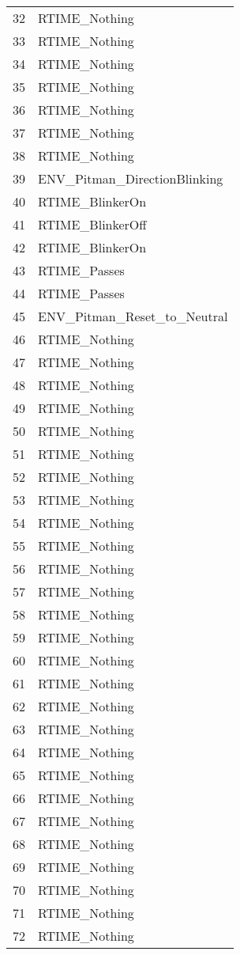 \documentclass[11pt]{article}
\begin{document}
\begin{longtable}{ll}
32 & RTIME\_Nothing \\
33 & RTIME\_Nothing \\
34 & RTIME\_Nothing \\
35 & RTIME\_Nothing \\
36 & RTIME\_Nothing \\
37 & RTIME\_Nothing \\
38 & RTIME\_Nothing \\
39 & ENV\_Pitman\_DirectionBlinking \\
40 & RTIME\_BlinkerOn \\
41 & RTIME\_BlinkerOff \\
42 & RTIME\_BlinkerOn \\
43 & RTIME\_Passes \\
44 & RTIME\_Passes \\
45 & ENV\_Pitman\_Reset\_to\_Neutral \\
46 & RTIME\_Nothing \\
47 & RTIME\_Nothing \\
48 & RTIME\_Nothing \\
49 & RTIME\_Nothing \\
50 & RTIME\_Nothing \\
51 & RTIME\_Nothing \\
52 & RTIME\_Nothing \\
53 & RTIME\_Nothing \\
54 & RTIME\_Nothing \\
55 & RTIME\_Nothing \\
56 & RTIME\_Nothing \\
57 & RTIME\_Nothing \\
58 & RTIME\_Nothing \\
59 & RTIME\_Nothing \\
60 & RTIME\_Nothing \\
61 & RTIME\_Nothing \\
62 & RTIME\_Nothing \\
63 & RTIME\_Nothing \\
64 & RTIME\_Nothing \\
65 & RTIME\_Nothing \\
66 & RTIME\_Nothing \\
67 & RTIME\_Nothing \\
68 & RTIME\_Nothing \\
69 & RTIME\_Nothing \\
70 & RTIME\_Nothing \\
71 & RTIME\_Nothing \\
72 & RTIME\_Nothing \\

\end{longtable}
\end{document}
